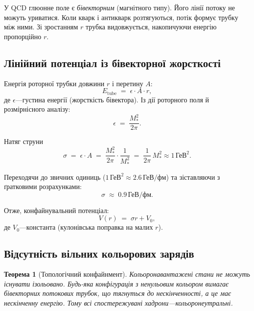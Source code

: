 \documentclass[11pt,a4paper]{article}
\theoremstyle{definition}
\theoremstyle{plain}
\newtheorem{theorem}{Теорема}[section]
\theoremstyle{remark}
\begin{document}
У QCD глюонне поле є \emph{бівекторним} (магнітного типу). Його лінії потоку не можуть уриватися. Коли кварк і антикварк розтягуються, потік формує трубку між ними. Зі зростанням $r$ трубка видовжується, накопичуючи енергію пропорційно $r$.

\subsection{Лінійний потенціал із бівекторної жорсткості}

Енергія роторної трубки довжини $r$ і перетину $A$:
\begin{equation}
E_{\mathrm{tube}} \;=\; \epsilon \cdot A \cdot r,
\label{eq:tube-energy}
\end{equation}
де $\epsilon$—густина енергії (жорсткість бівектора). Із дії роторного поля й розмірнісного аналізу:
\begin{equation}
\epsilon \;=\; \frac{M_\ast^2}{2\pi}.
\end{equation}

Натяг струни
\begin{equation}
\sigma \;=\; \epsilon \cdot A \;=\; \frac{M_\ast^2}{2\pi}\cdot\frac{1}{M_\ast^2} \;=\; \frac{1}{2\pi}\,M_\ast^2 \approx 1\,\text{ГеВ}^2.
\end{equation}

Переходячи до звичних одиниць ($1\,\text{ГеВ}^2 \approx 2{.}6\,\text{ГеВ/фм}$) та зіставляючи з ґратковими розрахунками:
\begin{equation}
\boxed{\sigma \;\approx\; 0{.}9\,\text{ГеВ/фм}.}
\label{eq:string-tension}
\end{equation}

Отже, конфайнувальний потенціал:
\begin{equation}
V(r) \;=\; \sigma r + V_0,
\label{eq:linear-potential}
\end{equation}
де $V_0$—константа (кулонівська поправка на малих $r$).

\subsection{Відсутність вільних кольорових зарядів}

\begin{theorem}[Топологічний конфайнмент]
Кольоронавантажені стани не можуть існувати ізольовано. Будь-яка конфігурація з ненульовим кольором вимагає бівекторних потокових трубок, що тягнуться до нескінченності, а це має нескінченну енергію. Тому всі спостережувані хадрони—кольоронеутральні.
\end{theorem}
\end{document}
